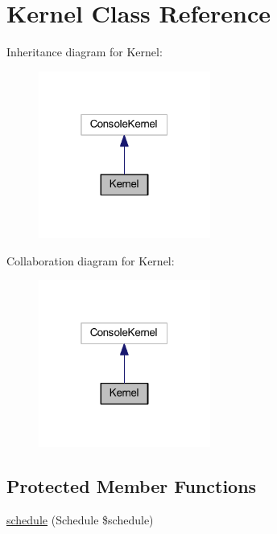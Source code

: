 \hypertarget{class_app_1_1_console_1_1_kernel}{}\section{Kernel Class Reference}
\label{class_app_1_1_console_1_1_kernel}


Inheritance diagram for Kernel\+:
\nopagebreak
\begin{figure}[H]
\begin{center}
\leavevmode
\includegraphics[width=160pt]{class_app_1_1_console_1_1_kernel__inherit__graph}
\end{center}
\end{figure}


Collaboration diagram for Kernel\+:
\nopagebreak
\begin{figure}[H]
\begin{center}
\leavevmode
\includegraphics[width=160pt]{class_app_1_1_console_1_1_kernel__coll__graph}
\end{center}
\end{figure}
\subsection*{Protected Member Functions}
\begin{DoxyCompactItemize}
\item 
\mbox{\hyperlink{class_app_1_1_console_1_1_kernel_ac8f0af578c80277b7a25381c6a9e268c}{schedule}} (Schedule \$schedule)
\end{DoxyCompactItemize}
